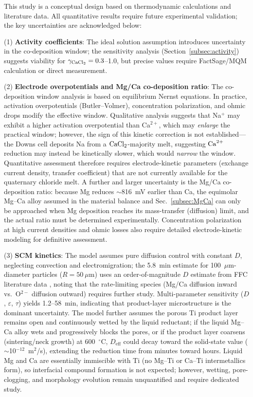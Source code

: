 \documentclass[sn-mathphys,Numbered]{sn-jnl}
\begin{document}
This study is a conceptual design based on thermodynamic calculations and literature data. All quantitative results require future experimental validation; the key uncertainties are acknowledged below:

(1) \textbf{Activity coefficients}: The ideal solution assumption introduces uncertainty in the co-deposition window; the sensitivity analysis (Section~\ref{subsec:activity}) suggests viability for $\gamma_{\ce{CaCl2}} = 0.3$--1.0, but precise values require FactSage/MQM calculation or direct measurement.

(2) \textbf{Electrode overpotentials and Mg/Ca co-deposition ratio}: The co-deposition window analysis is based on equilibrium Nernst equations. In practice, activation overpotentials (Butler--Volmer), concentration polarization, and ohmic drops modify the effective window. Qualitative analysis suggests that Na$^+$ may exhibit a higher activation overpotential than Ca$^{2+}$, which may \emph{enlarge} the practical window; however, the sign of this kinetic correction is not established---the Downs cell deposits Na from a $\ce{CaCl2}$-majority melt, suggesting $\ce{Ca^{2+}}$ reduction may instead be kinetically slower, which would \emph{narrow} the window. Quantitative assessment therefore requires electrode-kinetic parameters (exchange current density, transfer coefficient) that are not currently available for the quaternary chloride melt. A further and larger uncertainty is the Mg/Ca co-deposition ratio: because Mg reduces $\sim$816~mV earlier than Ca, the equimolar Mg--Ca alloy assumed in the material balance and Sec.~\ref{subsec:MgCa} can only be approached when Mg deposition reaches its mass-transfer (diffusion) limit, and the actual ratio must be determined experimentally. Concentration polarization at high current densities and ohmic losses also require detailed electrode-kinetic modeling for definitive assessment.

(3) \textbf{SCM kinetics}: The model assumes pure diffusion control with constant $D$, neglecting convection and electromigration; the 5.8~min estimate for 100~$\mu$m-diameter particles ($R = 50~\mu$m) uses an order-of-magnitude $D$ estimate from FFC literature data \cite{fray2000,yan2007}, noting that the rate-limiting species (Mg/Ca diffusion inward vs.\ O$^{2-}$ diffusion outward) requires further study. Multi-parameter sensitivity ($D$, $\varepsilon$, $\tau$) yields 1.2--58~min, indicating that product-layer microstructure is the dominant uncertainty. The model further assumes the porous Ti product layer remains open and continuously wetted by the liquid reductant; if the liquid Mg--Ca alloy wets and progressively blocks the pores, or if the product layer coarsens (sintering/neck growth) at 600~$^{\circ}$C, $D_{\mathrm{eff}}$ could decay toward the solid-state value ($\sim$10$^{-12}$~m$^2$/s), extending the reduction time from minutes toward hours. Liquid Mg and Ca are essentially immiscible with Ti (no Mg--Ti or Ca--Ti intermetallics form), so interfacial compound formation is not expected; however, wetting, pore-clogging, and morphology evolution remain unquantified and require dedicated study.
\end{document}
